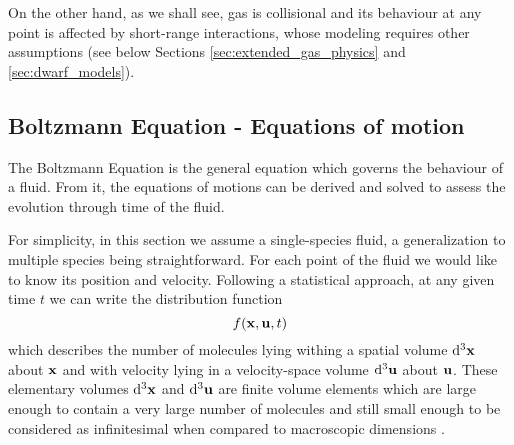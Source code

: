 On the other hand, as we shall see, gas is collisional and its behaviour at any point is affected by short-range interactions, whose modeling requires other assumptions (see below Sections \ref{sec:extended_gas_physics} and \ref{sec:dwarf_models}).

\subsection{Boltzmann Equation - Equations of motion}
The Boltzmann Equation is the general equation which governs the behaviour of a fluid.
From it, the equations of motions can be derived and solved to assess the evolution through time of the fluid.

For simplicity, in this section we assume a single-species fluid, a generalization to multiple species being straightforward.
For each point of the fluid we would like to know its position and velocity.
Following a statistical approach, at any given time $t$ we can write the distribution function
\begin{equation}
f(\boldsymbol{\mathbf{x}}, \boldsymbol{\mathbf{u}}, t)
\end{equation}
which describes the number of molecules lying withing a spatial volume $\dd[3]{\boldsymbol{\mathbf{x}}}$ about $\boldsymbol{\mathbf{x}}$ and with velocity lying in a velocity-space volume $\dd[3]{\boldsymbol{\mathbf{u}}}$ about $\boldsymbol{\mathbf{u}}$.
These elementary volumes $\dd[3]{\boldsymbol{\mathbf{x}}}$ and $\dd[3]{\boldsymbol{\mathbf{u}}}$ are finite volume elements which are large enough to contain a very large number of molecules and still small enough to be considered as infinitesimal when compared to macroscopic dimensions \citep{Huang1987}.

